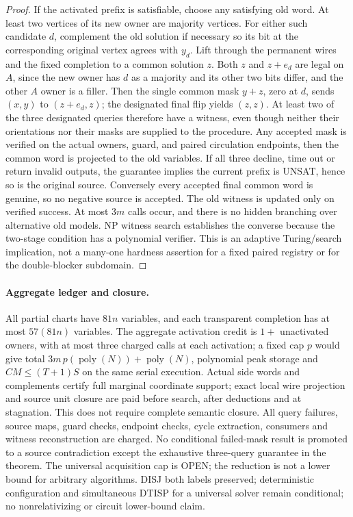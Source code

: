 \documentclass[11pt]{article}
\begin{document}
\begin{proof}
If the activated prefix is satisfiable, choose any satisfying old word. At least two vertices of its new owner are majority vertices. For either such candidate $d$, complement the old solution if necessary so its bit at the corresponding original vertex agrees with $y_d$. Lift through the permanent wires and the fixed completion to a common solution $z$. Both $z$ and $z+e_d$ are legal on $A$, since the new owner has $d$ as a majority and its other two bits differ, and the other $A$ owner is a filler. Then the single common mask $y+z$, zero at $d$, sends $(x,y)$ to $(z+e_d,z)$; the designated final flip yields $(z,z)$. At least two of the three designated queries therefore have a witness, even though neither their orientations nor their masks are supplied to the procedure. Any accepted mask is verified on the actual owners, guard, and paired circulation endpoints, then the common word is projected to the old variables. If all three decline, time out or return invalid outputs, the guarantee implies the current prefix is UNSAT, hence so is the original source. Conversely every accepted final common word is genuine, so no negative source is accepted. The old witness is updated only on verified success. At most $3m$ calls occur, and there is no hidden branching over alternative old models. NP witness search establishes the converse because the two-stage condition has a polynomial verifier. This is an adaptive Turing/search implication, not a many-one hardness assertion for a fixed paired registry or for the double-blocker subdomain.
\end{proof}

\paragraph{Aggregate ledger and closure.}
All partial charts have $81n$ variables, and each transparent completion has at most $57(81n)$ variables. The aggregate activation credit is $1+$ unactivated owners, with at most three charged calls at each activation; a fixed cap $p$ would give total $3m\,p(\operatorname{poly}(N))+\operatorname{poly}(N)$, polynomial peak storage and $CM\le(T+1)S$ on the same serial execution. Actual side words and complements certify full marginal coordinate support; exact local wire projection and source unit closure are paid before search, after deductions and at stagnation. This does not require complete semantic closure. All query failures, source maps, guard checks, endpoint checks, cycle extraction, consumers and witness reconstruction are charged. No conditional failed-mask result is promoted to a source contradiction except the exhaustive three-query guarantee in the theorem. The universal acquisition cap is OPEN; the reduction is not a lower bound for arbitrary algorithms. DISJ both labels preserved; deterministic configuration and simultaneous DTISP for a universal solver remain conditional; no nonrelativizing or circuit lower-bound claim.
\end{document}
